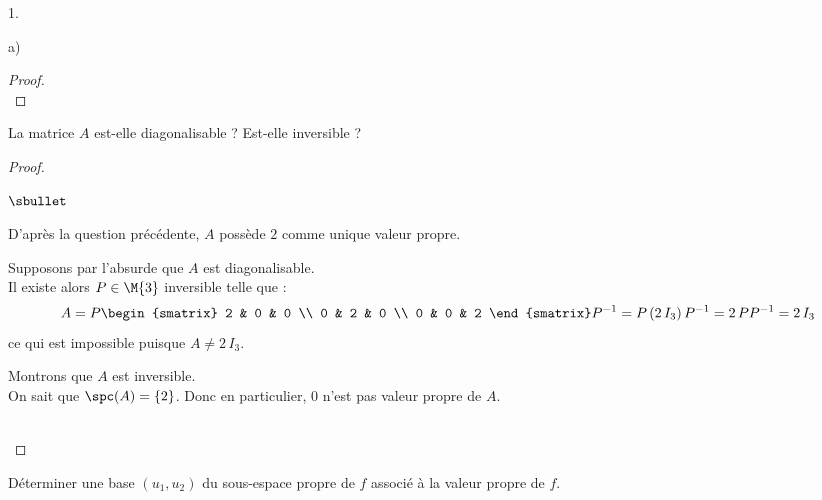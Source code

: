 \documentclass[11pt]{article}%
\begin{document}
\begin{noliste}{1.}
\begin{noliste}{a)}
\begin{proof}
      ~\\[-1.2cm]
    \end{proof}		

  \item La matrice $A$ est-elle diagonalisable ? Est-elle inversible ?
  \end{noliste}

    \begin{proof}~
      \begin{noliste}{$\sbullet$}
      \item D'après la question précédente, $A$ possède $2$ comme
        unique valeur propre. %
      \item Supposons par l'absurde que $A$ est diagonalisable.\\
        Il existe alors $P \in \M{3}$ inversible telle que : 
        \[
        A = P
        \begin{smatrix}
          2 & 0 & 0 \\
          0 & 2 & 0 \\
          0 & 0 & 2           
        \end{smatrix}
        P^{-1} %
        = %
        P \, (2 \, I_3) \, P^{-1} %
        = %
        2 \, PP^{-1} %
        = %
        2 \, I_3
        \]
        ce qui est impossible puisque $A \neq 2 \, I_3$.%
	
      \item Montrons que $A$ est inversible.\\
	On sait que $\spc(A) = \{2\}$. Donc en particulier, $0$ n'est
        pas valeur propre de $A$. %
      \end{noliste}
    ~\\[-1.2cm]
  \end{proof}		

\item Déterminer une base $(u_{1},u_{2})$ du sous-espace propre de $f$
  associé à la valeur propre de $f$.


\end{noliste}
\end{document}
